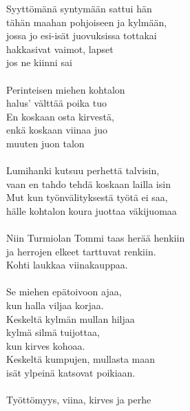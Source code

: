 
        Syyttömänä syntymään sattui hän \\
        tähän maahan pohjoiseen ja kylmään, \\
        jossa jo esi-isät juovuksissa tottakai \\
        hakkasivat vaimot, lapset \\
        jos ne kiinni sai \\
\hspace{10mm} \\
        Perinteisen miehen kohtalon \\
        halus' välttää poika tuo \\
        En koskaan osta kirvestä, \\
        enkä koskaan viinaa juo \\
        muuten juon talon \\
\hspace{10mm} \\
        Lumihanki kutsuu perhettä talvisin, \\
        vaan en tahdo tehdä koskaan lailla isin \\
        Mut kun työnvälityksestä työtä ei saa, \\
        hälle kohtalon koura juottaa väkijuomaa \\
\hspace{10mm} \\
        Niin Turmiolan Tommi taas herää henkiin \\
        ja herrojen elkeet tarttuvat renkiin. \\
        Kohti laukkaa viinakauppaa. \\
\hspace{10mm} \\
        Se miehen epätoivoon ajaa, \\
        kun halla viljaa korjaa. \\
        Keskeltä kylmän mullan hiljaa \\
        kylmä silmä tuijottaa, \\
        kun kirves kohoaa. \\
        Keskeltä kumpujen, mullasta maan \\
        isät ylpeinä katsovat poikiaan. \\
\hspace{10mm} \\
        Työttömyys, viina, kirves ja perhe \\
